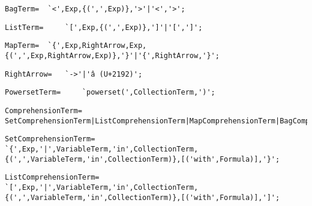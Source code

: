 \documentclass{article}
\begin{document}
    \begin{flushleft}
    \begin{lstlisting}[mathescape=true, breaklines=true]
      BagTerm= 	`<',Exp,{(',',Exp)},'>'|'<','>';
    \end{lstlisting}
    \end{flushleft}
    \begin{flushleft}
    \begin{lstlisting}[mathescape=true, breaklines=true]
      ListTerm= 	`[',Exp,{(',',Exp)},']'|'[',']';
    \end{lstlisting}
    \end{flushleft}
    \begin{flushleft}
    \begin{lstlisting}[mathescape=true, breaklines=true]
      MapTerm= 	`{',Exp,RightArrow,Exp,{(',',Exp,RightArrow,Exp)},'}'|'{',RightArrow,'}';
    \end{lstlisting}
    \end{flushleft}
    \begin{flushleft}
    \begin{lstlisting}[mathescape=true, breaklines=true]
      RightArrow= 	`->'|'â (U+2192)';
    \end{lstlisting}
    \end{flushleft}
    \begin{flushleft}
    \begin{lstlisting}[mathescape=true, breaklines=true]
      PowersetTerm= 	`powerset(',CollectionTerm,')';
    \end{lstlisting}
    \end{flushleft}
    \begin{flushleft}
    \begin{lstlisting}[mathescape=true, breaklines=true]
      ComprehensionTerm= 	SetComprehensionTerm|ListComprehensionTerm|MapComprehensionTerm|BagComprehensionTerm|NumberRangeTerm;
    \end{lstlisting}
    \end{flushleft}
    \begin{flushleft}
    \begin{lstlisting}[mathescape=true, breaklines=true]
      SetComprehensionTerm= 	`{',Exp,'|',VariableTerm,'in',CollectionTerm,{(',',VariableTerm,'in',CollectionTerm)},[('with',Formula)],'}';
    \end{lstlisting}
    \end{flushleft}
    \begin{flushleft}
    \begin{lstlisting}[mathescape=true, breaklines=true]
      ListComprehensionTerm= 	`[',Exp,'|',VariableTerm,'in',CollectionTerm,{(',',VariableTerm,'in',CollectionTerm)},[('with',Formula)],']';
    \end{lstlisting}
    \end{flushleft}
\end{document}
